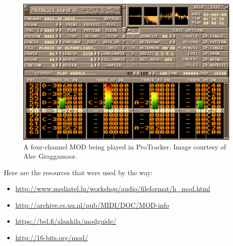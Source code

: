\begin{figure}[H]
	\includegraphics[width = \textwidth]{images/Protracker.png}
	\caption{A four-channel MOD being played in ProTracker. Image courtesy of Alec Graggamoor.}
	\label{img-protracker}
\end{figure}

Here are the resources that were used by the way:
\begin{itemize}
	\item{\url{http://www.mediatel.lu/workshop/audio/fileformat/h_mod.html}}
	\item{\url{http://archive.cs.uu.nl/pub/MIDI/DOC/MOD-info}}
	\item{\url{https://bel.fi/alankila/modguide/}}
	\item{\url{http://16-bits.org/mod/}}
\end{itemize}

\newpage


